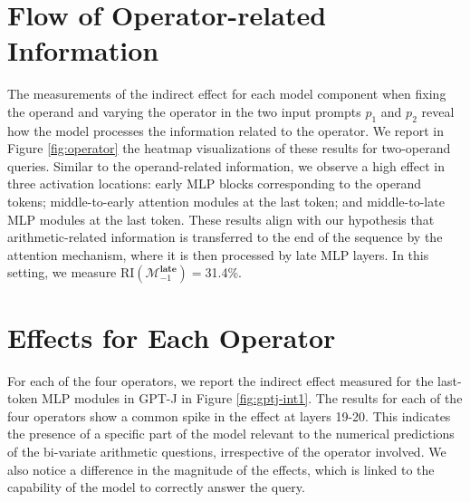\documentclass[11pt]{article}
\begin{document}
\section{Flow of Operator-related Information}
\label{appendix:operator}
The measurements of the indirect effect for each model component when fixing the operand and varying the operator in the two input prompts $p_1$ and $p_2$ reveal how the model processes the information related to the operator. We report in Figure \ref{fig:operator} the heatmap visualizations of these results for two-operand queries. Similar to the operand-related information, we observe a high effect in three activation locations: early MLP blocks corresponding to the operand tokens; middle-to-early attention modules at the last token; and middle-to-late MLP modules at the last token. These results align with our hypothesis that arithmetic-related information is transferred to the end of the sequence by the attention mechanism, where it is then processed by late MLP layers. In this setting, we measure $\mathrm{RI}(\mathcal{M}_{-1}^{\textbf{late}}) =$31.4\%.



\section{Effects for Each Operator}
For each of the four operators, we report the indirect effect measured for the last-token MLP modules in GPT-J in Figure \ref{fig:gptj-int1}. The results for each of the four operators show a common spike in the effect at layers 19-20. This indicates the presence of a specific part of the model relevant to the numerical predictions of the bi-variate arithmetic questions, irrespective of the operator involved.
We also notice a difference in the magnitude of the effects, which is linked to the capability of the model to correctly answer the query.
\end{document}
